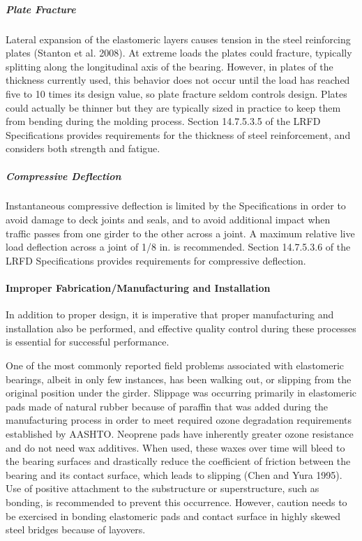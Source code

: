 \subparagraph{Plate Fracture}

Lateral expansion of the elastomeric layers causes tension in the steel reinforcing plates (Stanton et al. 2008). At
extreme loads the plates could fracture, typically splitting along the longitudinal axis of the bearing. However, in
plates of the thickness currently used, this behavior does not occur until the load has reached five to 10 times its
design value, so plate fracture seldom controls design. Plates could actually be thinner but they are typically sized in
practice to keep them from bending during the molding process. Section 14.7.5.3.5 of the LRFD Specifications
provides requirements for the thickness of steel reinforcement, and considers both strength and fatigue.

\subparagraph{Compressive Deflection}

Instantaneous compressive deflection is limited by the Specifications in order to avoid damage to deck joints and
seals, and to avoid additional impact when traffic passes from one girder to the other across a joint. A maximum
relative live load deflection across a joint of 1/8 in. is recommended. Section 14.7.5.3.6 of the LRFD Specifications
provides requirements for compressive deflection.

\paragraph{Improper Fabrication/Manufacturing and Installation}
In addition to proper design, it is imperative that proper manufacturing and installation also be performed, and
effective quality control during these processes is essential for successful performance.

One of the most commonly reported field problems associated with elastomeric bearings, albeit in only few
instances, has been walking out, or slipping from the original position under the girder. Slippage was occurring
primarily in elastomeric pads made of natural rubber because of paraffin that was added during the manufacturing
process in order to meet required ozone degradation requirements established by AASHTO. Neoprene pads have
inherently greater ozone resistance and do not need wax additives. When used, these waxes over time will bleed to
the bearing surfaces and drastically reduce the coefficient of friction between the bearing and its contact surface,
which leads to slipping (Chen and Yura 1995). Use of positive attachment to the substructure or superstructure, such
as bonding, is recommended to prevent this occurrence. However, caution needs to be exercised in bonding
elastomeric pads and contact surface in highly skewed steel bridges because of layovers.

